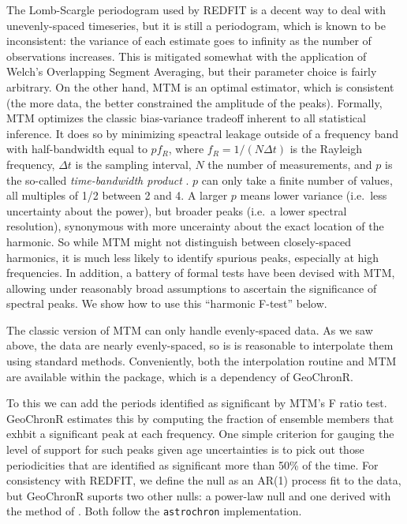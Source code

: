 \documentclass[gc, manuscript]{copernicus}
\begin{document}
The Lomb-Scargle periodogram used by REDFIT is a decent way to deal with unevenly-spaced timeseries, but it is still a periodogram, which is known to be inconsistent: the variance of each estimate goes to infinity as the number of observations increases.
This is mitigated somewhat with the application of Welch's Overlapping Segment Averaging, but their parameter choice is fairly arbitrary.
On the other hand, MTM \citep{thomson82} is an optimal estimator, which is consistent (the more data, the better constrained the amplitude of the peaks).
Formally, MTM optimizes the classic bias-variance tradeoff inherent to all statistical inference.
It does so by minimizing speactral leakage outside of a frequency band with half-bandwidth equal to \(pf_R\), where \(f_R=1/(N \Delta t)\) is the Rayleigh frequency, \(\Delta t\) is the sampling interval, \(N\) the number of measurements, and \(p\) is the so-called \emph{time-bandwidth product} \citep{Ghil02}.
\(p\) can only take a finite number of values, all multiples of 1/2 between 2 and 4.
A larger \(p\) means lower variance (i.e.~less uncertainty about the power), but broader peaks (i.e.~a lower spectral resolution), synonymous with more uncerainty about the exact location of the harmonic.
So while MTM might not distinguish between closely-spaced harmonics, it is much less likely to identify spurious peaks, especially at high frequencies.
In addition, a battery of formal tests have been devised with MTM, allowing under reasonably broad assumptions to ascertain the significance of spectral peaks.
We show how to use this ``harmonic F-test'' below.

The classic version of MTM can only handle evenly-spaced data.
As we saw above, the data are nearly evenly-spaced, so is is reasonable to interpolate them using standard methods.
Conveniently, both the interpolation routine and MTM are available within the \citep[astrochron][]{astrochron} package, which is a dependency of GeoChronR.

To this we can add the periods identified as significant by MTM's F ratio test.
GeoChronR estimates this by computing the fraction of ensemble members that exhbit a significant peak at each frequency.
One simple criterion for gauging the level of support for such peaks given age uncertainties is to pick out those periodicities that are identified as significant more than 50\% of the time.
For consistency with REDFIT, we define the null as an AR(1) process fit to the data, but GeoChronR suports two other nulls: a power-law null and one derived with the method of \citet{MannLees96}.
Both follow the \texttt{astrochron} implementation.
\end{document}
